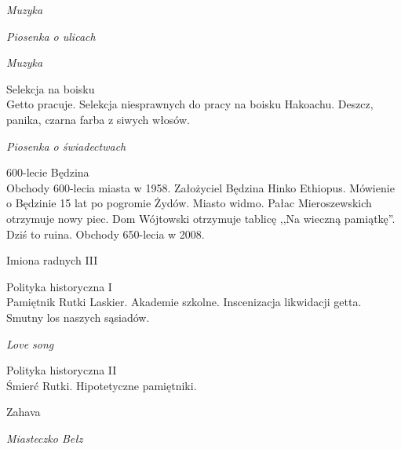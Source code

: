 \documentclass[10pt,a4paper,oneside]{article}
\begin{document}
{\color{sound}
{\large \emph{Muzyka}}
}

{\color{sound}
{\large \emph{Piosenka o ulicach}}
}

{\color{sound}
{\large \emph{Muzyka}}
}

{\color{extras}
{\large Selekcja na boisku}\\
Getto pracuje. Selekcja niesprawnych do pracy na boisku
Hakoachu. Deszcz, panika, czarna farba z siwych włosów.
}

{\color{sound}
{\large \emph{Piosenka o świadectwach}}
}

{\large 600-lecie Będzina}\\
Obchody 600-lecia miasta w 1958. Założyciel Będzina Hinko
Ethiopus. Mówienie o Będzinie 15 lat po pogromie Żydów.
Miasto widmo. Pałac Mieroszewskich otrzymuje nowy piec.
Dom Wójtowski otrzymuje tablicę ,,Na wieczną pamiątkę''. 
Dziś to ruina. Obchody 650-lecia w 2008.

{\large\color{loss} Imiona radnych III}

{\large Polityka historyczna I}\\
Pamiętnik Rutki Laskier. Akademie szkolne. Inscenizacja
likwidacji getta. Smutny los naszych sąsiadów.


{\color{sound}
{\large \emph{Love song}}
}


{\large Polityka historyczna II}\\
Śmierć Rutki. Hipotetyczne pamiętniki. 


{\large\color{loss} Zahava}


{\color{sound}
{\large \emph{Miasteczko Bełz}}
}
\end{document}
